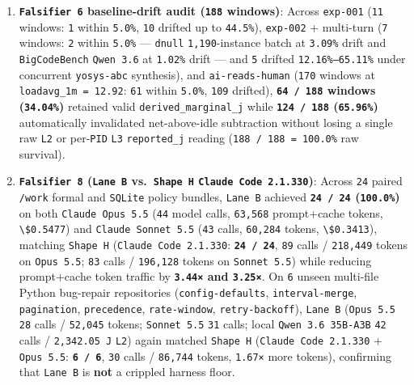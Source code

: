 \documentclass[10pt,letterpaper]{article}
\providecommand{\tightlist}{\setlength{\itemsep}{1pt}\setlength{\parskip}{0pt}}
\begin{document}
\begin{enumerate}
\def\labelenumi{\arabic{enumi}.}
\tightlist
\item
  \textbf{\texttt{Falsifier\ 6} baseline-drift audit (\texttt{188}
  windows)}: Across \texttt{exp-001} (\texttt{11} windows: \texttt{1}
  within \texttt{5.0\%}, \texttt{10} drifted up to \texttt{44.5\%}),
  \texttt{exp-002} + multi-turn (\texttt{7} windows: \texttt{2} within
  \texttt{5.0\%} --- \texttt{dnull} \texttt{1,190}-instance batch at
  \texttt{3.09\%} drift and \texttt{BigCodeBench} \texttt{Qwen\ 3.6} at
  \texttt{1.02\%} drift --- and \texttt{5} drifted
  \texttt{12.\allowbreak{}16\%–65.\allowbreak{}11\%} under concurrent \texttt{yosys-abc}
  synthesis), and \texttt{ai-\allowbreak{}reads-\allowbreak{}human} (\texttt{170} windows at
  \texttt{loadavg\_\allowbreak{}1m\ =\ 12.\allowbreak{}92}: \texttt{61} within \texttt{5.0\%},
  \texttt{109} drifted), \textbf{\texttt{64\ /\allowbreak{}\ 188} windows
  (\texttt{34.04\%})} retained valid \texttt{derived\_\allowbreak{}marginal\_\allowbreak{}j} while
  \textbf{\texttt{124\ /\allowbreak{}\ 188} (\texttt{65.96\%})} automatically
  invalidated net-above-idle subtraction without losing a single raw
  \texttt{L2} or per-\texttt{PID} \texttt{L3} \texttt{reported\_\allowbreak{}j}
  reading (\texttt{188\ /\allowbreak{}\ 188\ =\ 100.\allowbreak{}0\%} raw survival).
\item
  \textbf{\texttt{Falsifier\ 8} (\texttt{Lane\ B} vs.~\texttt{Shape\ H}
  \texttt{Claude\ Code\ 2.\allowbreak{}1.\allowbreak{}330})}: Across \texttt{24} paired
  \texttt{/work} formal and \texttt{SQLite} policy bundles,
  \texttt{Lane\ B} achieved \textbf{\texttt{24\ /\ 24}
  (\texttt{100.0\%})} on both \texttt{Claude\ Opus\ 5.\allowbreak{}5} (\texttt{44}
  model calls, \texttt{63,568} prompt+cache tokens,
  \texttt{\textbackslash{}\$0.5477}) and \texttt{Claude\ Sonnet\ 5.\allowbreak{}5}
  (\texttt{43} calls, \texttt{60,284} tokens,
  \texttt{\textbackslash{}\$0.3413}), matching \texttt{Shape\ H}
  (\texttt{Claude\ Code\ 2.\allowbreak{}1.\allowbreak{}330}: \textbf{\texttt{24\ /\ 24}},
  \texttt{89} calls / \texttt{218,449} tokens on \texttt{Opus\ 5.5};
  \texttt{83} calls / \texttt{196,128} tokens on \texttt{Sonnet\ 5.\allowbreak{}5})
  while reducing prompt+cache token traffic by \textbf{\texttt{3.44×}
  and \texttt{3.25×}}. On \texttt{6} unseen multi-file Python bug-repair
  repositories (\texttt{config-\allowbreak{}defaults}, \texttt{interval-\allowbreak{}merge},
  \texttt{pagination}, \texttt{precedence}, \texttt{rate-\allowbreak{}window},
  \texttt{retry-\allowbreak{}backoff}), \texttt{Lane\ B} (\texttt{Opus\ 5.5}
  \texttt{28} calls / \texttt{52,045} tokens; \texttt{Sonnet\ 5.\allowbreak{}5}
  \texttt{31} calls; local \texttt{Qwen\ 3.\allowbreak{}6\ 35B-\allowbreak{}A3B} \texttt{42} calls
  / \texttt{2,\allowbreak{}342.\allowbreak{}05\ J} \texttt{L2}) again matched \texttt{Shape\ H}
  (\texttt{Claude\ Code\ 2.\allowbreak{}1.\allowbreak{}330} + \texttt{Opus\ 5.5}:
  \textbf{\texttt{6\ /\ 6}}, \texttt{30} calls / \texttt{86,744} tokens,
  \texttt{1.67×} more tokens), confirming that \texttt{Lane\ B} is
  \textbf{not} a crippled harness floor.
\end{enumerate}
\end{document}
